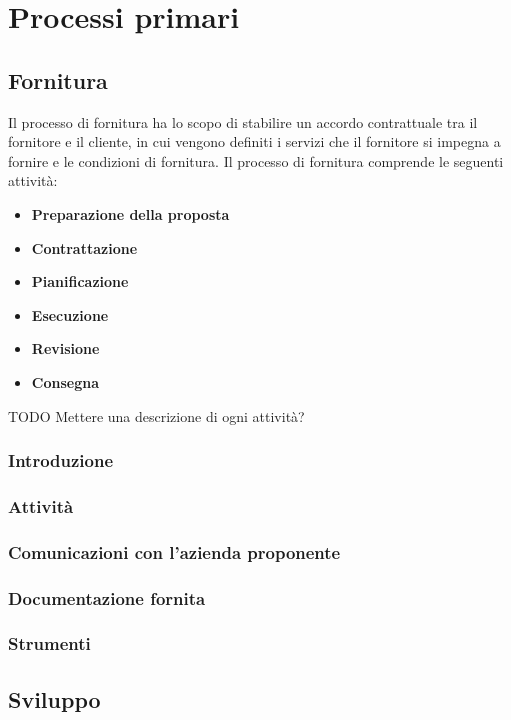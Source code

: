 \section{Processi primari}
\subsection{Fornitura}
Il processo di fornitura ha lo scopo di stabilire un accordo contrattuale tra il fornitore e il cliente, in cui vengono definiti i servizi che il fornitore si impegna a fornire e le condizioni di fornitura. 
Il processo di fornitura comprende le seguenti attività:
\begin{itemize}
	\itemsep0em
	\item \textbf{Preparazione della proposta}
	\item \textbf{Contrattazione}
	\item \textbf{Pianificazione}
	\item \textbf{Esecuzione}
	\item \textbf{Revisione}
	\item \textbf{Consegna}
\end{itemize}
TODO Mettere una descrizione di ogni attività?

\subsubsection{Introduzione}
\subsubsection{Attività}
\subsubsection{Comunicazioni con l'azienda proponente}
\subsubsection{Documentazione fornita}
\subsubsection{Strumenti}
\subsection{Sviluppo}
